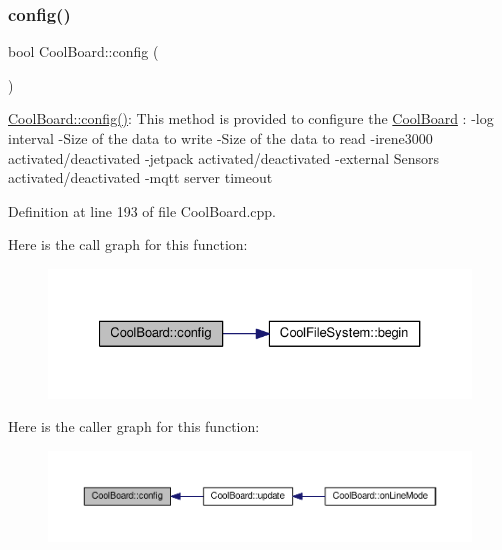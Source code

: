 \subsubsection{\texorpdfstring{config()}{config()}}
{\footnotesize\ttfamily bool Cool\+Board\+::config (\begin{DoxyParamCaption}{ }\end{DoxyParamCaption})}

\hyperlink{class_cool_board_a583a874c09c07e70a6eb9229fc4beddb}{Cool\+Board\+::config()}\+: This method is provided to configure the \hyperlink{class_cool_board}{Cool\+Board} \+: -\/log interval -\/\+Size of the data to write -\/\+Size of the data to read -\/irene3000 activated/deactivated -\/jetpack activated/deactivated -\/external Sensors activated/deactivated -\/mqtt server timeout 

Definition at line 193 of file Cool\+Board.\+cpp.

Here is the call graph for this function\+:\nopagebreak
\begin{figure}[H]
\begin{center}
\leavevmode
\includegraphics[width=327pt]{class_cool_board_a583a874c09c07e70a6eb9229fc4beddb_cgraph}
\end{center}
\end{figure}
Here is the caller graph for this function\+:\nopagebreak
\begin{figure}[H]
\begin{center}
\leavevmode
\includegraphics[width=350pt]{class_cool_board_a583a874c09c07e70a6eb9229fc4beddb_icgraph}
\end{center}
\end{figure}
\mbox{\label{class_cool_board_a519de78b807f8ec6463ff484eb925918}} 
